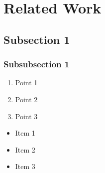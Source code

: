 \section{Related Work}
\subsection{Subsection 1}
\subsubsection{Subsubsection 1}
\lipsum[10]
\begin{enumerate}
    \item Point 1
    \item Point 2
    \item Point 3
\end{enumerate}
\lipsum[3]
\begin{itemize}
    \item Item 1
    \item Item 2
    \item Item 3
\end{itemize}
